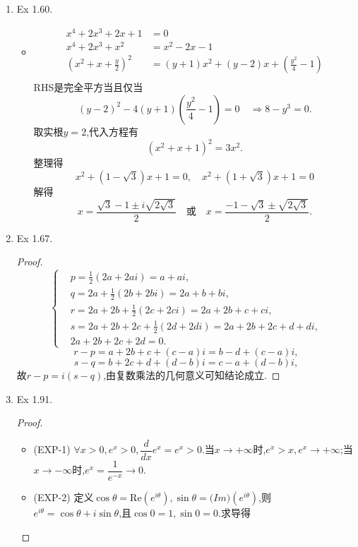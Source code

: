\documentclass[12pt, a4paper]{article}
\begin{document}
\begin{enumerate}
\begin{itemize}
    \end{itemize}
    \item Ex 1.60. \label{ex:1.60}
    \begin{itemize}
        \item[解] \begin{align*}
            x^4 + 2x^3 + 2x + 1 &= 0 \\
            x^4 + 2x^3 + x^2 &= x^2 - 2x - 1 \\
            \left(x^2 + x + \frac{y}{2}\right)^2 &= (y + 1)x^2 + (y - 2)x + \left(\frac{y^2}{4} - 1\right) \\
        \end{align*}
        RHS是完全平方当且仅当
        \[(y - 2)^2 - 4(y + 1)\left(\frac{y^2}{4} - 1\right) = 0 \quad \Rightarrow 8 - y^3 = 0.\]
        取实根\(y = 2\),代入方程有
        \[(x^2 + x + 1)^2 = 3x^2.\]
        整理得
        \[x^2 + (1 - \sqrt{3})x + 1 = 0, \quad x^2 + (1 + \sqrt{3})x + 1 = 0\]
        解得
        \[x = \frac{\sqrt{3} - 1 \pm i\sqrt{2\sqrt{3}}}{2} \quad \text{或} \quad x = \frac{-1 - \sqrt{3} \pm \sqrt{2\sqrt{3}}}{2}.\]
    \end{itemize}
    \item Ex 1.67. \label{ex:1.67.}
    \begin{proof}
        \[\begin{cases}
            &p = \frac{1}{2}(2a + 2ai) = a + ai, \\
            &q = 2a + \frac{1}{2}(2b + 2bi) = 2a + b + bi, \\
            &r = 2a + 2b + \frac{1}{2}(2c + 2ci) = 2a + 2b + c + ci, \\
            &s = 2a + 2b + 2c + \frac{1}{2}(2d + 2di) = 2a + 2b + 2c + d + di, \\
            &2a + 2b + 2c + 2d = 0.
        \end{cases}\]
        \[r - p = a + 2b + c + (c - a)i = b - d + (c - a)i,\]
        \[s - q = b + 2c + d + (d - b)i = c - a + (d - b)i,\]
        故\(r - p = i(s - q)\),由复数乘法的几何意义可知结论成立.
    \end{proof}
    \item Ex 1.91. \label{ex:1.91}
    \begin{proof}
        \begin{itemize}
            \item (EXP-1) \(\forall x > 0, e^x > 0, \dfrac{d}{dx}e^x = e^x > 0\).当\(x \to +\infty\)时,\(e^x > x, e^x \to +\infty\);当\(x \to -\infty\)时,\(e^x = \dfrac{1}{e^{-x}} \to 0\).
            \item (EXP-2) 定义\(\cos\theta = \mathrm{Re}(e^{i\theta}), \sin\theta = \mathrm(Im)(e^{i\theta})\),则\(e^{i\theta} = \cos\theta + i\sin\theta\),且\(\cos 0 = 1, \sin 0 = 0\).求导得

\end{itemize}
\end{proof}
\end{enumerate}
\end{document}
